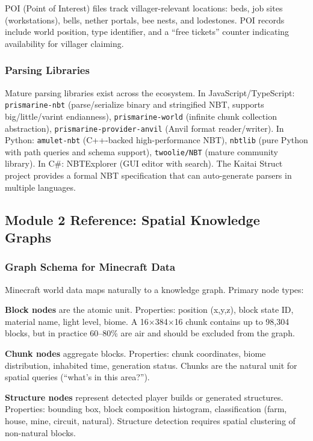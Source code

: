 \documentclass[11pt,letterpaper]{article}
\begin{document}
POI (Point of Interest) files track villager-relevant locations: beds, job sites (workstations), bells, nether portals, bee nests, and lodestones. POI records include world position, type identifier, and a ``free tickets'' counter indicating availability for villager claiming.

\subsubsection{Parsing Libraries}
Mature parsing libraries exist across the ecosystem. In JavaScript/TypeScript: \texttt{prismarine-nbt} (parse/serialize binary and stringified NBT, supports big/little/varint endianness), \texttt{prismarine-world} (infinite chunk collection abstraction), \texttt{prismarine-provider-anvil} (Anvil format reader/writer). In Python: \texttt{amulet-nbt} (C++-backed high-performance NBT), \texttt{nbtlib} (pure Python with path queries and schema support), \texttt{twoolie/NBT} (mature community library). In C\#: NBTExplorer (GUI editor with search). The Kaitai Struct project provides a formal NBT specification that can auto-generate parsers in multiple languages.

\subsection{Module 2 Reference: Spatial Knowledge Graphs}

\subsubsection{Graph Schema for Minecraft Data}
Minecraft world data maps naturally to a knowledge graph. Primary node types:

\textbf{Block nodes} are the atomic unit. Properties: position (x,y,z), block state ID, material name, light level, biome. A 16$\times$384$\times$16 chunk contains up to 98,304 blocks, but in practice 60--80\% are air and should be excluded from the graph.

\textbf{Chunk nodes} aggregate blocks. Properties: chunk coordinates, biome distribution, inhabited time, generation status. Chunks are the natural unit for spatial queries (``what's in this area?'').

\textbf{Structure nodes} represent detected player builds or generated structures. Properties: bounding box, block composition histogram, classification (farm, house, mine, circuit, natural). Structure detection requires spatial clustering of non-natural blocks.
\end{document}

